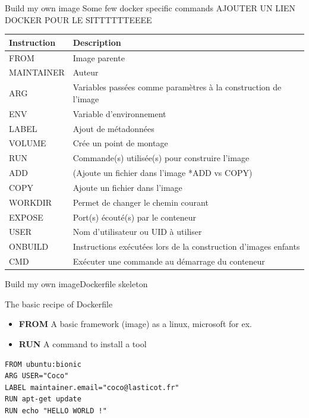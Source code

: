 \begin{frame}{Build my own image}
Some few docker specific commands
AJOUTER UN LIEN DOCKER POUR LE SITTTTTTEEEE
\newline
\newline
\centering
\begin{tabular}{ll}
Instruction & Description \\
\hline\hline
FROM & Image parente \\
MAINTAINER & Auteur \\
ARG & Variables passées comme paramètres à la construction de l'image \\
ENV & Variable d'environnement \\
LABEL & Ajout de métadonnées \\
VOLUME & Crée un point de montage \\
RUN & Commande(s) utilisée(s) pour construire l'image \\
ADD & (Ajoute un fichier dans l'image *ADD vs COPY) \\
COPY & Ajoute un fichier dans l'image \\
WORKDIR & Permet de changer le chemin courant \\
EXPOSE & Port(s) écouté(s) par le conteneur \\
USER & Nom d'utilisateur ou UID à utiliser \\
ONBUILD & Instructions exécutées lors de la construction d'images enfants \\
CMD & Exécuter une commande au démarrage du conteneur \\
\end{tabular}
\end{frame}

\begin{frame}[fragile]{Build my own image}{Dockerfile skeleton}
\begin{block}{The basic recipe of Dockerfile}
\begin{itemize}
\item \textbf{FROM} A basic framework (image) as a linux, microsoft for ex. 
\item \textbf{RUN} A command to install a tool
\end{itemize}
\end{block}
\begin{verbatim}
FROM ubuntu:bionic
ARG USER="Coco"
LABEL maintainer.email="coco@lasticot.fr"
RUN apt-get update
RUN echo "HELLO WORLD !"
\end{verbatim}
\end{frame}

